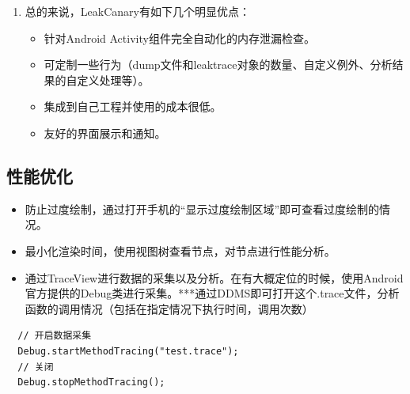 \documentclass[9pt, b5paper]{article}
\begin{document}
\begin{enumerate}
\begin{enumerate}
\begin{itemize}
\end{itemize}
\item 总的来说，LeakCanary有如下几个明显优点：
\label{sec-1-1-7-2-2}
\begin{itemize}
\item 针对Android Activity组件完全自动化的内存泄漏检查。
\item 可定制一些行为（dump文件和leaktrace对象的数量、自定义例外、分析结果的自定义处理等）。
\item 集成到自己工程并使用的成本很低。
\item 友好的界面展示和通知。
\end{itemize}
\end{enumerate}
\end{enumerate}

\subsection{性能优化}
\label{sec-1-2}
\begin{itemize}
\item 防止过度绘制，通过打开手机的“显示过度绘制区域”即可查看过度绘制的情况。
\item 最小化渲染时间，使用视图树查看节点，对节点进行性能分析。
\item 通过TraceView进行数据的采集以及分析。在有大概定位的时候，使用Android官方提供的Debug类进行采集。***通过DDMS即可打开这个.trace文件，分析函数的调用情况（包括在指定情况下执行时间，调用次数）
\end{itemize}
\begin{verbatim}
  // 开启数据采集 
  Debug.startMethodTracing("test.trace"); 
  // 关闭 
  Debug.stopMethodTracing();
\end{verbatim}
\end{document}
